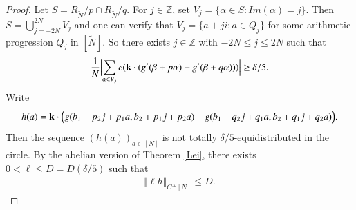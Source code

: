 \documentclass[12pt,amstex]{amsart}
\theoremstyle{definition}
\def \A {\alpha}
\def \B {\beta}
\def \d {\delta}
\def \R {R_{\tilde{N}}}
\begin{document}
\begin{proof}
Let $S=\R/p\cap \R/q$. For $j\in\mathbb{Z}$, set $V_{j}=\{\A\in S\colon Im(\A)=j\}$. Then $S=\bigcup_{j=-2N}^{2N}V_{j}$ and one can verify that $V_{j}=\{a+ji\colon a\in Q_{j}\}$ for some arithmetic progression $Q_{j}$ in $[\tilde{N}]$. So there exists $j\in\mathbb{Z}$ with $-2N\leq j\leq 2N$ such that
 \begin{equation}\nonumber
  \begin{split}
    \frac{1}{N}\Bigl\vert\sum_{\A\in V_{j}}e(\bold{k}\cdot (g'(\B+p\A)-g'(\B+q\A)))\Bigr\vert\geq\d/5.
  \end{split}
\end{equation}
Write
 \begin{equation}\nonumber
  \begin{split}
    h(a)=\bold{k}\cdot\Bigl(g(b_{1}-p_{2}j+p_{1}a,b_{2}+p_{1}j+p_{2}a)-g(b_{1}-q_{2}j+q_{1}a,b_{2}+q_{1}j+q_{2}a)\Bigr).
  \end{split}
\end{equation}
Then the sequence $(h(a))_{a\in[N]}$ is not totally $\d/5$-equidistributed in the circle. By the abelian version of Theorem \ref{Lei}, there exists $0<\ell\leq D=D(\d/5)$ such that 
 \begin{equation}\label{tempr1}
  \begin{split}
    \Vert \ell h\Vert_{C^{\infty}[N]}\leq D.
  \end{split}
\end{equation}



\end{proof}
\end{document}
